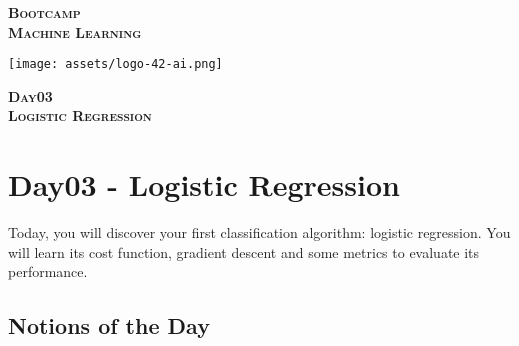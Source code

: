 \documentclass[]{article}
\date{}
\begin{document}

\vspace*{2cm}
\begin{center}
    \textsc{\fontsize{40}{48} \bfseries Bootcamp}\\[0.6cm]
    \textsc{\fontsize{39}{48} \bfseries { %
Machine Learning
    }}\\[0.3cm]
\end{center}
\vspace{3cm}

\begin{center}
\texttt{[image: assets/logo-42-ai.png]}{\centering}
\end{center}

\vspace*{2cm}
\begin{center}
    \textsc{\fontsize{32}{48} \bfseries %
Day03    
    }\\[0.6cm]
    \textsc{\fontsize{32}{48} \bfseries %
Logistic Regression    
    }\\[0.3cm]
\end{center}
\vspace{3cm}

\newpage

\setcounter{page}{1}



\hypertarget{day03---logistic-regression}{%
\section{Day03 - Logistic
Regression}\label{day03---logistic-regression}}

Today, you will discover your first classification algorithm: logistic
regression. You will learn its cost function, gradient descent and some
metrics to evaluate its performance.

\hypertarget{notions-of-the-day}{%
\subsection{Notions of the Day}\label{notions-of-the-day}}
\end{document}
